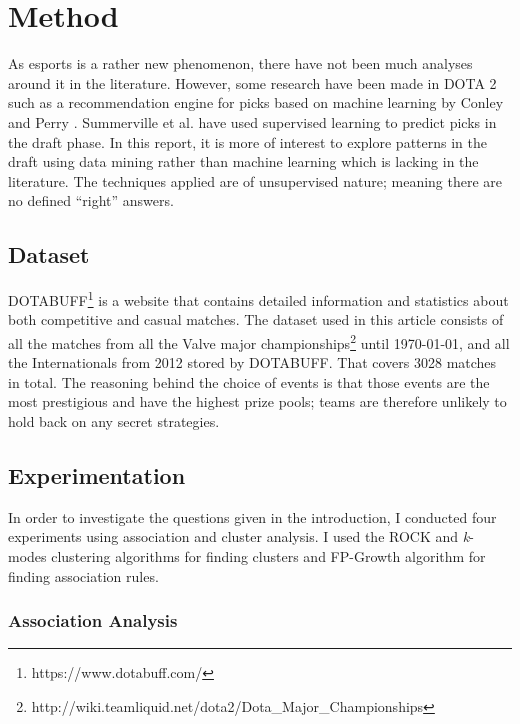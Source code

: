 \documentclass[report.tex]{subfiles}
\begin{document}
\section*{\centering Method}

As esports is a rather new phenomenon, there have not been much analyses around it in the literature. However, some research have been made in DOTA 2 such as a recommendation engine for picks based on machine learning by Conley and Perry \cite{conley2013does}. Summerville et al. \cite{cook2016draft} have used supervised learning to predict picks in the draft phase. In this report, it is more of interest to explore patterns in the draft using data mining rather than machine learning which is lacking in the literature. The techniques applied are of unsupervised nature; meaning there are no defined \enquote{right} answers.

\subsection*{Dataset}

DOTABUFF\footnote{https://www.dotabuff.com/} is a website that contains detailed information and statistics about both competitive and casual matches. The dataset used in this article consists of all the matches from all the Valve major championships\footnote{http://wiki.teamliquid.net/dota2/Dota\_Major\_Championships} until \today, and all the Internationals from 2012 stored by DOTABUFF. That covers 3028 matches in total. The reasoning behind the choice of events is that those events are the most prestigious and have the highest prize pools; teams are therefore unlikely to hold back on any secret strategies.

\subsection*{Experimentation}

In order to investigate the questions given in the introduction, I conducted four experiments using association and cluster analysis. I used the ROCK and \textit{k}-modes clustering algorithms \cite{guha2000rock} for finding clusters and FP-Growth algorithm \cite{han2000mining} for finding association rules.

\subsubsection*{Association Analysis}
\end{document}
